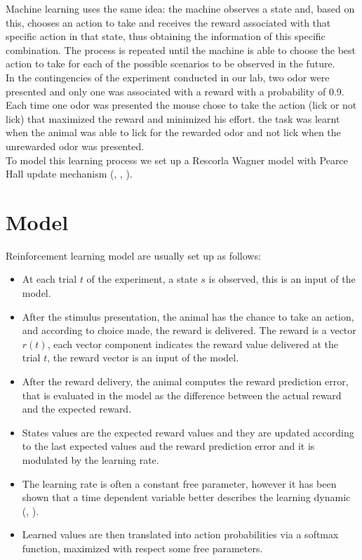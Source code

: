 Machine learning uses the same idea: the machine observes a state and, based on this, chooses an action to take and receives the reward associated with that specific action in that state, thus obtaining the information of this specific combination. The process is repeated until the machine is able to choose the best action to take for each of the possible scenarios to be observed in the future.\\In the contingencies of the experiment conducted in our lab, two odor were presented and only one was associated with a reward with a probability of 0.9. Each time one odor was presented the mouse chose to take the action (lick or not lick) that maximized the reward and minimized his effort. the task was learnt when the animal was able to lick for the rewarded odor and not lick when the unrewarded odor was presented.\\To model this learning process we set up a Rescorla Wagner model with Pearce Hall update mechanism (\cite{Li}, \cite{Costa}, \cite{Koppe}).\\

\section{Model}
Reinforcement learning model are usually set up as follows:
\begin{itemize}
    \item At each trial $t$ of the experiment, a state $s$ is observed, this is an input of the model.
    \item After the stimulus presentation, the animal has the chance to take an action, and according to choice made, the reward is delivered. The reward is a vector $r(t)$, each vector component indicates the reward value delivered at the trial $t$, the reward vector is an input of the model.
    \item After the reward delivery, the animal computes the reward prediction error, that is evaluated in the model as the difference between the actual reward and the expected reward.
    \item States values are the expected reward values and they are updated according to the last expected values and the reward prediction error and it is modulated by the learning rate.
    \item The learning rate is often a constant free parameter, however it has been shown that a time dependent variable better describes the learning dynamic (\cite{Funamizu}, \cite{Daw}).
    \item Learned values are then translated into action probabilities via a softmax function, maximized with respect some free parameters.
\end{itemize}


